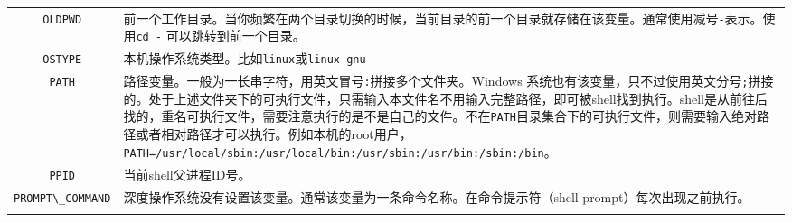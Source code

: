 \documentclass[doctor,openright,twoside]{sjtuthesis}
\newcommand{\passthrough}[1]{#1}
\theoremstyle{plain}
\theoremstyle{definition}
\theoremstyle{remark}
\theoremstyle{ocrenumbox}
\theoremstyle{plain}
\begin{document}
\begin{longtable}[]{@{}cl@{}}
\begin{minipage}[t]{0.23\columnwidth}
\passthrough{\lstinline!OLDPWD!}\strut
\end{minipage} & \begin{minipage}[t]{0.72\columnwidth}\raggedright
前一个工作目录。当你频繁在两个目录切换的时候，当前目录的前一个目录就存储在该变量。通常使用减号\passthrough{\lstinline!-!}表示。使用\passthrough{\lstinline!cd -!}
可以跳转到前一个目录。\strut
\end{minipage}\tabularnewline
\begin{minipage}[t]{0.23\columnwidth}\centering
\passthrough{\lstinline!OSTYPE!}\strut
\end{minipage} & \begin{minipage}[t]{0.72\columnwidth}\raggedright
本机操作系统类型。比如\passthrough{\lstinline!linux!}或\passthrough{\lstinline!linux-gnu!}\strut
\end{minipage}\tabularnewline
\begin{minipage}[t]{0.23\columnwidth}\centering
\passthrough{\lstinline!PATH!}\strut
\end{minipage} & \begin{minipage}[t]{0.72\columnwidth}\raggedright
路径变量。一般为一长串字符，用英文冒号\passthrough{\lstinline!:!}拼接多个文件夹。Windows
系统也有该变量，只不过使用英文分号\passthrough{\lstinline!;!}拼接的。处于上述文件夹下的可执行文件，只需输入本文件名不用输入完整路径，即可被shell找到执行。shell是从前往后找的，重名可执行文件，需要注意执行的是不是自己的文件。不在\passthrough{\lstinline!PATH!}目录集合下的可执行文件，则需要输入绝对路径或者相对路径才可以执行。例如本机的root用户，\passthrough{\lstinline!PATH=/usr/local/sbin:/usr/local/bin:/usr/sbin:/usr/bin:/sbin:/bin!}。\strut
\end{minipage}\tabularnewline
\begin{minipage}[t]{0.23\columnwidth}\centering
\passthrough{\lstinline!PPID!}\strut
\end{minipage} & \begin{minipage}[t]{0.72\columnwidth}\raggedright
当前shell父进程ID号。\strut
\end{minipage}\tabularnewline
\begin{minipage}[t]{0.23\columnwidth}\centering
\passthrough{\lstinline!PROMPT\_COMMAND!}\strut
\end{minipage} & \begin{minipage}[t]{0.72\columnwidth}\raggedright
深度操作系统没有设置该变量。通常该变量为一条命令名称。在命令提示符（shell
prompt）每次出现之前执行。\strut
\end{minipage}\tabularnewline
\begin{minipage}[t]{0.23\columnwidth}\centering

\end{minipage}
\end{longtable}
\end{document}
